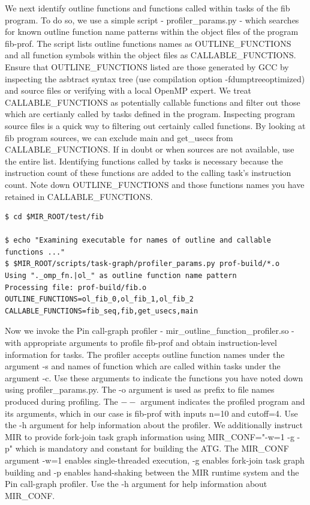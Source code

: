 \documentclass[11pt,a4paper,notitlepage]{article}
\begin{document}
We next identify outline functions and functions called within tasks of the fib program. 
To do so, we use a simple script - profiler\_params.py - which searches for known outline function name patterns within the object files of the program fib-prof. 
The script lists outline functions names as OUTLINE\_FUNCTIONS and all function symbols within the object files as CALLABLE\_FUNCTIONS.
Ensure that OUTLINE\_FUNCTIONS listed are those generated by GCC by inspecting the asbtract syntax tree (use compilation option -fdumptreeoptimized) and source files or verifying with a local OpenMP expert.
We treat CALLABLE\_FUNCTIONS as potentially callable functions and filter out those which are certianly called by tasks defined in the program. 
Inspecting program source files is a quick way to filtering out certainly called functions. 
By looking at fib program sources, we can exclude main and get\_usecs from CALLABLE\_FUNCTIONS. 
If in doubt or when sources are not available, use the entire list.
Identifying functions called by tasks is necessary because the instruction count of these functions are added to the calling task's instruction count.
Note down OUTLINE\_FUNCTIONS and those functions names you have retained in CALLABLE\_FUNCTIONS.

\begin{lstlisting}[style=BashInputStyle]
$ cd $MIR_ROOT/test/fib

$ echo "Examining executable for names of outline and callable functions ..."
$ $MIR_ROOT/scripts/task-graph/profiler_params.py prof-build/*.o
Using "._omp_fn.|ol_" as outline function name pattern
Processing file: prof-build/fib.o
OUTLINE_FUNCTIONS=ol_fib_0,ol_fib_1,ol_fib_2
CALLABLE_FUNCTIONS=fib_seq,fib,get_usecs,main
\end{lstlisting}

Now we invoke the Pin call-graph profiler - mir\_outline\_function\_profiler.so - with appropriate arguments to profile fib-prof and obtain instruction-level information for tasks.
The profiler accepts outline function names under the argument -s and names of function which are called within tasks under the argument -c. 
Use these arguments to indicate the functions you have noted down using profiler\_params.py.
The -o argument is used as prefix to file names produced during profiling.
The $--$ argument indicates the profiled program and its arguments, which in our case is fib-prof with inputs n=10 and cutoff=4.
Use the -h argument for help information about the profiler.
We additionally instruct MIR to provide fork-join task graph information using MIR\_CONF="-w=1 -g -p" which is mandatory and constant for building the ATG.
The MIR\_CONF argument -w=1 enables single-threaded execution, -g enables fork-join task graph building and -p enables hand-shaking between the MIR runtime system and the Pin call-graph profiler.
Use the -h argument for help information about MIR\_CONF.
\end{document}
